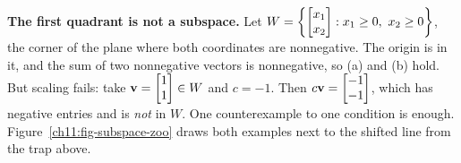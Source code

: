 \begin{example}\label{ch11:not-subspace}
\textbf{The first quadrant is not a subspace.} Let
$W = \left\{\begin{bmatrix}x_1\\x_2\end{bmatrix} : x_1\ge 0,\ x_2\ge 0\right\}$, the corner of the plane where
both coordinates are nonnegative. The origin is in it, and the sum of two nonnegative
vectors is nonnegative, so (a) and (b) hold. But scaling fails: take
$\mathbf{v}=\begin{bmatrix}1\\1\end{bmatrix}\in W$ and $c=-1$. Then $c\mathbf{v} = \begin{bmatrix}-1\\-1\end{bmatrix}$, which has
negative entries and is \emph{not} in $W$. One counterexample to one condition is enough.
Figure~\ref{ch11:fig-subspace-zoo} draws both examples next to the shifted line from the
trap above.
\end{example}

